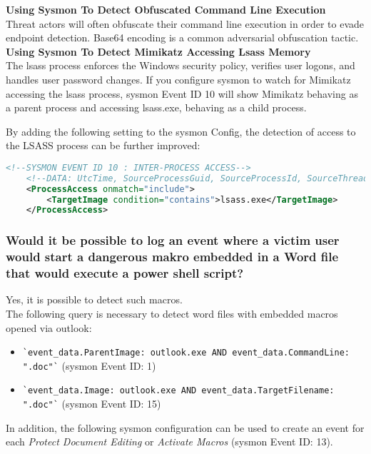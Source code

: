 \textbf{Using Sysmon To Detect Obfuscated Command Line Execution}\\
Threat actors will often obfuscate their command line execution in order to evade endpoint detection. Base64 encoding is a common adversarial obfuscation tactic.\\

\textbf{Using Sysmon To Detect Mimikatz Accessing Lsass Memory}\\
The lsass process enforces the Windows security policy, verifies user logons, and handles user password changes. If you configure sysmon to watch for Mimikatz accessing the lsass process, sysmon Event ID 10 will show Mimikatz behaving as a parent process and accessing lsass.exe, behaving as a child process.

By adding the following setting to the sysmon Config, the detection of access to the LSASS process can be further improved:

\begin{lstlisting}[language=XML]
    <!--SYSMON EVENT ID 10 : INTER-PROCESS ACCESS-->
    <!--DATA: UtcTime, SourceProcessGuid, SourceProcessId, SourceThreadId, SourceImage, TargetProcessGuid, TargetProcessId, TargetImage, GrantedAccess, CallTrace-->
    <ProcessAccess onmatch="include">
        <TargetImage condition="contains">lsass.exe</TargetImage>
    </ProcessAccess>
\end{lstlisting}

\newpage

\subsubsection{Would it be possible to log an event where a victim user would start a dangerous makro embedded in a Word file that would execute a power shell script?}
Yes, it is possible to detect such macros.\\
The following query is necessary to detect word files with embedded macros opened via outlook:\\
\begin{itemize}
    \item \lstinline|`event_data.ParentImage: outlook.exe AND event_data.CommandLine: ".doc"`| (sysmon Event ID: 1)
    \item \lstinline|`event_data.Image: outlook.exe AND event_data.TargetFilename: ".doc"`| (sysmon Event ID: 15)\\
\end{itemize}

In addition, the following sysmon configuration can be used to create an event for each \textit{Protect Document Editing} or \textit{Activate Macros} (sysmon Event ID: 13).

